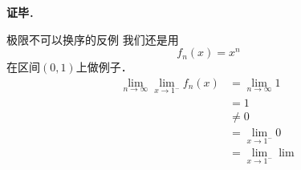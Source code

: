 \textbf{证毕}．



\begin{example}{极限不可以换序的反例}
我们还是用
\begin{equation}
f_n(x)=x^n
\end{equation}
在区间$(0, 1)$上做例子．
\begin{equation}
\begin{aligned}
\lim\limits_{n\to\infty}\lim\limits_{x\to 1^-}f_n(x)&=\lim\limits_{n\to\infty}1\\
&=1\\
&\not=0\\
&=\lim\limits_{x\to 1^-} 0\\
&=\lim\limits_{x\to 1^-}\lim\limits{}
\end{aligned}
\end{equation}
\end{example}


















